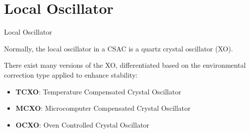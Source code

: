 \section{Local Oscillator}

\begin{frame}{Local Oscillator}

    Normally, the local oscillator in a CSAC is a quartz crystal oscillator (XO).

    There exist many versions of the XO, differentiated based on the environmental correction type applied to enhance stability:

    \begin{itemize}
        \item \textbf{TCXO}: Temperature Compensated Crystal Oscillator
        \item \textbf{MCXO}: Microcomputer Compensated Crystal Oscillator
        \item \textbf{OCXO}: Oven Controlled Crystal Oscillator
    \end{itemize}

\end{frame}



